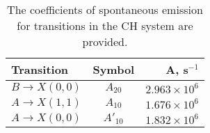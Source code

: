 \begin{table}
  \caption[Einstein A coefficients]{The coefficients of spontaneous emission for transitions in the CH system are provided.}
  \begin{center}
    \begin{tabular}{lcr}
      Transition & Symbol & A, s\(^{-1}\) \tabularnewline
      \hline\hline
      \(B\rightarrow X(0,0)\) & \(A_{20}\) & \(2.963 \times 10^6\) \tabularnewline
      \(A\rightarrow X(1,1)\) & \(A_{10}\) & \(1.676 \times 10^6\) \tabularnewline
      \(A\rightarrow X(0,0)\) & \(A'_{10}\) & \(1.832 \times 10^6\) \tabularnewline
      \hline
    \end{tabular}
  \end{center}
  \label{tab:emissionCoefficients}
\end{table}

